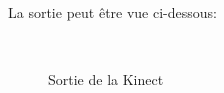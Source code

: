 \documentclass[a4paper,12pt]{article}
\begin{document}

La sortie peut être vue ci-dessous:

\begin{center} 
  \begin{figure}
    \begin{center} 
      \
      \hspace{1cm} \
    \caption{Sortie de la Kinect}
    \end{center}
  \end{figure}
\end{center}
\end{document}
